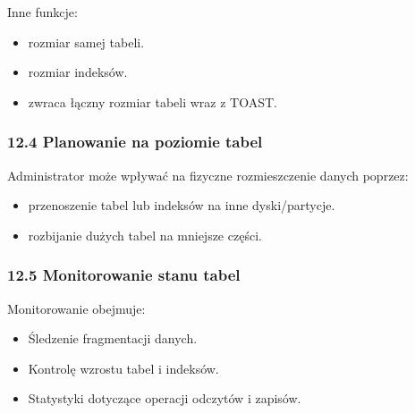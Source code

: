 \documentclass[a4paper,11pt,openany,english]{sphinxmanual}
\begin{document}
\sphinxAtStartPar
Inne funkcje:
\begin{itemize}
\item {} 
\sphinxAtStartPar
{} \textendash{} rozmiar samej tabeli.

\item {} 
\sphinxAtStartPar
{} \textendash{} rozmiar indeksów.

\item {} 
\sphinxAtStartPar
{} \textendash{} zwraca łączny rozmiar tabeli wraz z TOAST.

\end{itemize}


\subsubsection{12.4 Planowanie na poziomie tabel}
\label{\detokenize{rozdzial2/Konfiguracja_baz_danych/Konfiguracja_baz_danych:planowanie-na-poziomie-tabel}}
\sphinxAtStartPar
Administrator może wpływać na fizyczne rozmieszczenie danych poprzez:
\begin{itemize}
\item {} 
\sphinxAtStartPar
{} \textendash{} przenoszenie tabel lub indeksów na inne dyski/partycje.

\item {} 
\sphinxAtStartPar
{} \textendash{} rozbijanie dużych tabel na mniejsze części.

\end{itemize}


\subsubsection{12.5 Monitorowanie stanu tabel}
\label{\detokenize{rozdzial2/Konfiguracja_baz_danych/Konfiguracja_baz_danych:monitorowanie-stanu-tabel}}
\sphinxAtStartPar
Monitorowanie obejmuje:
\begin{itemize}
\item {} 
\sphinxAtStartPar
Śledzenie fragmentacji danych.

\item {} 
\sphinxAtStartPar
Kontrolę wzrostu tabel i indeksów.

\item {} 
\sphinxAtStartPar
Statystyki dotyczące operacji odczytów i zapisów.

\end{itemize}
\end{document}
